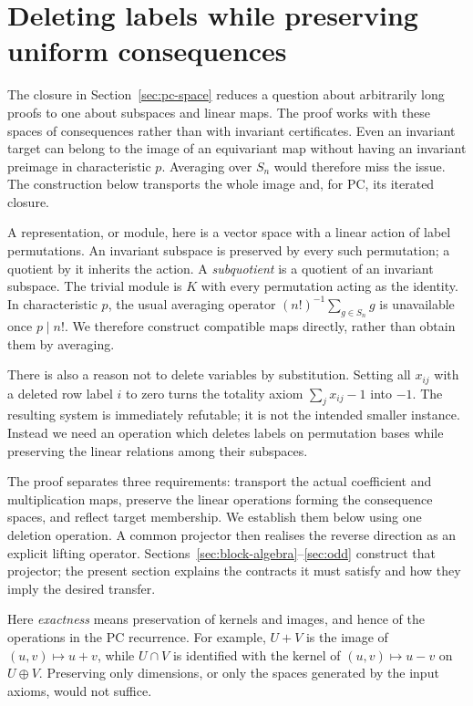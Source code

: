 \section{Deleting labels while preserving uniform consequences}\label{sec:transfer}
The closure in Section~\ref{sec:pc-space} reduces a question about
arbitrarily long proofs to one about subspaces and linear maps. The
proof works with these spaces of consequences rather than with invariant certificates. Even an invariant target can belong to the image of an equivariant map without having an invariant preimage in characteristic $p$. Averaging over $S_n$ would therefore miss the issue. The construction below transports the whole image and, for PC, its iterated closure.

A representation, or module, here is a vector space with a linear action
of label permutations. An invariant subspace is preserved by every
such permutation; a quotient by it inherits the action. A
\emph{subquotient} is a quotient of an invariant subspace. The trivial
module is $K$ with every permutation acting as the identity. In
characteristic $p$, the usual averaging operator
$(n!)^{-1}\sum_{g\in S_n}g$ is unavailable once $p\mid n!$.
We therefore construct compatible maps directly, rather than obtain
them by averaging.

There is also a reason not to delete variables by substitution. Setting
all $x_{ij}$ with a deleted row label $i$ to zero turns the totality axiom
$\sum_jx_{ij}-1$ into $-1$. The resulting system is immediately refutable;
it is not the intended smaller instance. Instead we need an operation
which deletes labels on permutation bases while preserving the linear
relations among their subspaces.

The proof separates three requirements: transport the actual coefficient
and multiplication maps, preserve the linear operations forming the
consequence spaces, and reflect target membership. We establish them
below using one deletion operation. A common projector then realises
the reverse direction as an explicit lifting operator. Sections~\ref{sec:block-algebra}--\ref{sec:odd}
construct that projector; the present section explains the contracts
it must satisfy and how they imply the desired transfer.

Here \emph{exactness} means preservation of kernels and images, and hence
of the operations in the PC recurrence. For example, $U+V$ is the image
of $(u,v)\mapsto u+v$, while $U\cap V$ is identified with the kernel of
$(u,v)\mapsto u-v$ on $U\oplus V$. Preserving only dimensions, or only
the spaces generated by the input axioms, would not suffice.

